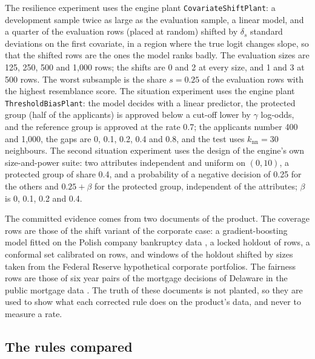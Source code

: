The resilience experiment uses the engine plant \texttt{CovariateShiftPlant}: a development sample twice as large as the evaluation sample, a linear model, and a quarter of the evaluation rows (placed at random) shifted by $\delta_s$ standard deviations on the first covariate, in a region where the true logit changes slope, so that the shifted rows are the ones the model ranks badly. The evaluation sizes are 125, 250, 500 and 1,000 rows; the shifts are 0 and 2 at every size, and 1 and 3 at 500 rows. The worst subsample is the share $s=0.25$ of the evaluation rows with the highest resemblance score. The situation experiment uses the engine plant \texttt{ThresholdBiasPlant}: the model decides with a linear predictor, the protected group (half of the applicants) is approved below a cut-off lower by $\gamma$ log-odds, and the reference group is approved at the rate 0.7; the applicants number 400 and 1,000, the gaps are 0, 0.1, 0.2, 0.4 and 0.8, and the test uses $k_{\mathrm{nn}}=30$ neighbours. The second situation experiment uses the design of the engine's own size-and-power suite: two attributes independent and uniform on $(0,10)$, a protected group of share 0.4, and a probability of a negative decision of 0.25 for the others and $0.25+\beta$ for the protected group, independent of the attributes; $\beta$ is 0, 0.1, 0.2 and 0.4.

The committed evidence comes from two documents of the product. The coverage rows are those of the shift variant of the corporate case: a gradient-boosting model fitted on the Polish company bankruptcy data \citep{zieba2016}, a locked holdout of \CmBaseM{} rows, a conformal set calibrated on \CmNcal{} rows, and windows of the holdout shifted by sizes taken from the Federal Reserve hypothetical corporate portfolios. The fairness rows are those of six year pairs of the mortgage decisions of Delaware in the public mortgage data \citep{hmda2018}. The truth of these documents is not planted, so they are used to show what each corrected rule does on the product's data, and never to measure a rate.

\subsection{The rules compared}

